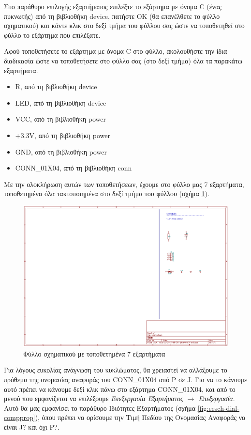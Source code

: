 \documentclass[a4paper]{article}
\begin{document}
Στο παράθυρο επιλογής εξαρτήματος επιλέξτε το εξάρτημα με όνομα C (ένας πυκνωτής) από τη βιβλιοθήκη device, πατήστε ΟΚ (θα επανέλθετε το φύλλο σχηματικού) και κάντε κλικ στο δεξί τμήμα του φύλλου σας ώστε να τοποθετηθεί στο φύλλο το εξάρτημα που επιλέξατε. 

Αφού τοποθετήσετε το εξάρτημα με όνομα C στο φύλλο, ακολουθήστε την ίδια διαδικασία ώστε να τοποθετήσετε στο φύλλο σας (στο δεξί τμήμα) όλα τα παρακάτω εξαρτήματα. 

\begin{itemize}
    \item R, από τη βιβλιοθήκη device
    \item LED, από τη βιβλιοθήκη device
    \item VCC, από τη βιβλιοθήκη power
    \item +3.3V, από τη βιβλιοθήκη power
    \item GND, από τη βιβλιοθήκη power
    \item CONN\_01X04, από τη βιβλιοθήκη conn
\end{itemize}

Με την ολοκλήρωση αυτών των τοποθετήσεων, έχουμε στο φύλλο μας 7 εξαρτήματα, τοποθετημένα όλα τακτοποιημένα στο δεξί τμήμα του φύλλου (σχήμα \ref{fig:eesch-circ-placedccomp}).

\begin{figure}
  \begin{center}
    \includegraphics[width=.9\textwidth]{img/eesch-circ-placedccomp.png}
    \caption{Φύλλο σχηματικού με τοποθετημένα 7 εξαρτήματα}
    \label{fig:eesch-circ-placedccomp}
  \end{center}
\end{figure}

Για λόγους ευκολίας ανάγνωση του κυκλώματος, θα χρειαστεί να αλλάξουμε το πρόθεμα της ονομασίας αναφοράς του CONN\_01X04 από P σε J. Για να το κάνουμε αυτό πρέπει να κάνουμε δεξί κλικ πάνω στο εξάρτημα CONN\_01X04, και από το μενού που εμφανίζεται να επιλέξουμε \textit{Επεξεργασία Εξαρτήματος $\rightarrow$ Επεξεργασία}. Αυτό θα μας εμφανίσει το παράθυρο Ιδιότητες Εξαρτήματος (σχήμα \ref{fig:eesch-dial-compprop}), όπου πρέπει να ορίσουμε την Τιμή Πεδίου της Ονομασίας Αναφοράς να είναι J? και όχι P?.
\end{document}
